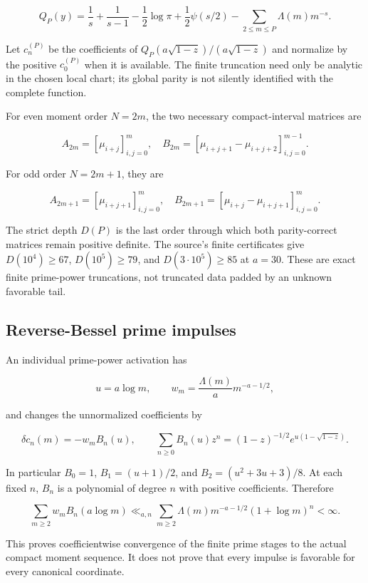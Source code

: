 \documentclass[
  10pt,
  a4paper,
  10pt,
  oneside,
  openany]{book}
\begin{document}
\[
 Q_P(y)=\frac1s+\frac1{s-1}-\frac12\log\pi
 +\frac12\psi(s/2)-\sum_{2\le m\le P}\Lambda(m)m^{-s}.
 \tag{34.3}\label{eq:34.3}
\]

Let \(c_n^{(P)}\) be the coefficients of
\(Q_P(a\sqrt{1-z})/(a\sqrt{1-z})\) and normalize by the positive
\(c_0^{(P)}\) when it is available. The finite truncation need only be
analytic in the chosen local chart; its global parity is not silently
identified with the complete function.

For even moment order \(N=2m\), the two necessary compact-interval
matrices are

\[
 A_{2m}=[\mu_{i+j}]_{i,j=0}^m,
 \quad B_{2m}=[\mu_{i+j+1}-\mu_{i+j+2}]_{i,j=0}^{m-1}.
\]

For odd order \(N=2m+1\), they are

\[
 A_{2m+1}=[\mu_{i+j+1}]_{i,j=0}^m,
 \quad B_{2m+1}=[\mu_{i+j}-\mu_{i+j+1}]_{i,j=0}^m.
 \tag{34.4}\label{eq:34.4}
\]

The strict depth \(D(P)\) is the last order through which both
parity-correct matrices remain positive definite. The source's finite
certificates give \(D(10^4)\ge67\), \(D(10^5)\ge79\), and
\(D(3\cdot10^5)\ge85\) at \(a=30\). These are exact finite prime-power
truncations, not truncated data padded by an unknown favorable tail.

\subsection{Reverse-Bessel prime
impulses}\label{reverse-bessel-prime-impulses}

An individual prime-power activation has

\[
 u=a\log m,\qquad
 w_m=\frac{\Lambda(m)}a m^{-a-1/2},
\]

and changes the unnormalized coefficients by

\[
 \delta c_n(m)=-w_mB_n(u),\qquad
 \sum_{n\ge0}B_n(u)z^n
 =(1-z)^{-1/2}e^{u(1-\sqrt{1-z})}.
 \tag{34.5}\label{eq:34.5}
\]

In particular \(B_0=1\), \(B_1=(u+1)/2\), and \(B_2=(u^2+3u+3)/8\). At
each fixed \(n\), \(B_n\) is a polynomial of degree \(n\) with positive
coefficients. Therefore

\[
 \sum_{m\ge2}w_mB_n(a\log m)
 \ll_{a,n}\sum_{m\ge2}\Lambda(m)m^{-a-1/2}(1+\log m)^n<\infty.
\]

This proves coefficientwise convergence of the finite prime stages to
the actual compact moment sequence. It does not prove that every impulse
is favorable for every canonical coordinate.
\end{document}
